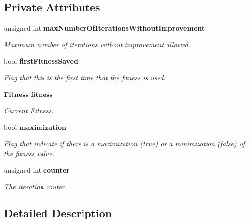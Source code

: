 \subsection*{Private Attributes}
\begin{CompactItemize}
\item 
unsigned int {\bf maxNumberOfIterationsWithoutImprovement}\label{classmo_no_fit_impr_sol_continue_03612ffc3af9d943c1b1d2cde09d461b}

\begin{CompactList}\small\item\em Maximum number of iterations without improvement allowed. \item\end{CompactList}\item 
bool {\bf firstFitnessSaved}\label{classmo_no_fit_impr_sol_continue_ca3591e47a075b59e0826f31234c71ef}

\begin{CompactList}\small\item\em Flag that this is the first time that the fitness is used. \item\end{CompactList}\item 
{\bf Fitness} {\bf fitness}\label{classmo_no_fit_impr_sol_continue_3d3d2b43a4dd73e38689cc0018d44ee7}

\begin{CompactList}\small\item\em Current Fitness. \item\end{CompactList}\item 
bool {\bf maximization}
\begin{CompactList}\small\item\em Flag that indicate if there is a maximization (true) or a minimization (false) of the fitness value. \item\end{CompactList}\item 
unsigned int {\bf counter}\label{classmo_no_fit_impr_sol_continue_46fc008a8f7cd06dcaaeb4016b433adb}

\begin{CompactList}\small\item\em The iteration couter. \item\end{CompactList}\end{CompactItemize}


\subsection{Detailed Description}
